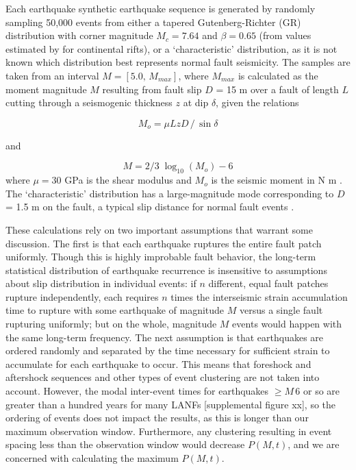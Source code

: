 \documentclass[twocolumn,grl]{AGUTeX}
\begin{document}
\begin{article}
Each earthquake synthetic earthquake sequence is generated by
randomly sampling 50,000 events from either a tapered Gutenberg-Richter (GR)
distribution with corner magnitude $M_c = 7.64$ and $\beta = 0.65$
(from values estimated by \citet{birdkagan2004f_m} for continental
rifts), or a `characteristic' distribution, as it is not known which
distribution best represents normal fault seismicity.  The samples are taken 
from an interval $M = [5.0, \, M_{max}]$, where $M_{max}$ is calculated as the
moment magnitude $M$ resulting from fault slip $D$ = 15 m over a fault of
length $L$ cutting through a seismogenic thickness $z$ at dip $\delta$,
given the relations

\begin{equation}
 M_o = \mu L z D \,/ \, \sin \delta 
 \end{equation}

and

\begin{equation}
M = 2/3 \; \log_{10} (M_o) - 6
\end{equation}
where $\mu = 30$ GPa is the shear modulus and $M_o$ is the seismic
moment in N m \citep{kagan2003pepi}.  The `characteristic' distribution has a
large-magnitude mode corresponding to $D$ = 1.5 m on the fault, a typical
slip distance for normal fault events \citep[e.g.][]{caskey1996}.

These calculations rely on two important assumptions that warrant some
discussion.  The first is that each earthquake ruptures the entire
fault patch uniformly.  Though this is highly improbable fault behavior,
the long-term statistical distribution of earthquake recurrence is 
insensitive to assumptions about slip distribution in individual events:
if $n$ different, equal fault patches rupture independently, each 
requires $n$ times the interseismic strain accumulation time to rupture with
some earthquake of magnitude $M$ versus a single fault rupturing uniformly; 
but on the whole, magnitude $M$ events would happen with the same long-term
frequency.  The next assumption is that earthquakes are ordered randomly and
separated by the time necessary for sufficient strain to accumulate for each
earthquake to occur.  This means that foreshock and aftershock sequences
and other types of event clustering are not taken into account.  However,
the modal inter-event times for earthquakes $\ge M \,6$ or so are greater than
a hundred years for many LANFs [supplemental figure xx], so the ordering of
events does not impact the results, as this is longer than our maximum
observation window.  Furthermore, any clustering resulting in
event spacing less than the observation window would decrease $P(M,t)$, and
we are concerned with calculating the maximum $P(M,t)$.


\end{article}
\end{document}
